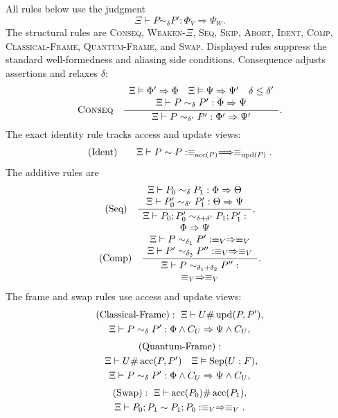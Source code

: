 \documentclass[conference,compsoc]{IEEEtran}
\newenvironment{tightdisplay}{%
  \begingroup
  \setlength{\arraycolsep}{2pt}%
  \[
}{%
  \]
  \endgroup
}
\begin{document}
All rules below use the judgment
\[
\Xi\vdash
P\sim_\delta P':\Phi_V\Longrightarrow\Psi_W .
\]
The structural rules are \textsc{Conseq}, \textsc{Weaken-\(\Xi\)},
\textsc{Seq}, \textsc{Skip}, \textsc{Abort}, \textsc{Ident}, \textsc{Comp},
\textsc{Classical-Frame}, \textsc{Quantum-Frame}, and \textsc{Swap}. Displayed
rules suppress the standard well-formedness and aliasing side conditions.
Consequence adjusts assertions and relaxes \(\delta\):
\begin{tightdisplay}
\textsc{Conseq}\quad
\frac{\begin{array}{c}
\Xi\vDash\Phi'\Rightarrow\Phi\quad
\Xi\vDash\Psi\Rightarrow\Psi'\quad
\delta\le\delta'\\
\Xi\vdash
P\sim_\delta P':\Phi\Rightarrow\Psi
\end{array}}
{\Xi\vdash
P\sim_{\delta'}P':\Phi'\Rightarrow\Psi'} .
\end{tightdisplay}
The exact identity rule tracks access and update views:
\[
\text{\rm (Ident)}\qquad
\Xi\vdash P\sim P:
\equiv_{\operatorname{acc}(P)}
\Longrightarrow
\equiv_{\operatorname{upd}(P)} .
\]
The additive rules are
\[
\begin{array}{c}
\text{\rm (Seq)}\quad
\dfrac{\begin{array}{c}
\Xi\vdash P_0\sim_{\delta}P_1:\Phi\Rightarrow\Theta\\
\Xi\vdash P'_0\sim_{\delta'}P'_1:\Theta\Rightarrow\Psi
\end{array}}
{\begin{array}{c}
\Xi\vdash
P_0;P'_0\sim_{\delta+\delta'}P_1;P'_1:\\
\Phi\Rightarrow\Psi
\end{array}},
\\[4mm]
\text{\rm (Comp)}\quad
\dfrac{\begin{array}{c}
\Xi\vdash P\sim_{\delta_1}P':\equiv_V\Rightarrow\equiv_V\\
\Xi\vdash P'\sim_{\delta_2}P'':\equiv_V\Rightarrow\equiv_V
\end{array}}
{\begin{array}{c}
\Xi\vdash
P\sim_{\delta_1+\delta_2}P'':\\
\equiv_V\Rightarrow\equiv_V
\end{array}}.
\end{array}
\]
The frame and swap rules use access and update views:
\[
\begin{gathered}
\text{\rm (Classical-Frame)}:\ 
\Xi\vdash U\#\operatorname{upd}(P,P'),\\
\Xi\vdash
P\sim_\delta P':\Phi\land C_U\Rightarrow\Psi\land C_U,\\[1mm]
\text{\rm (Quantum-Frame)}:\\\ 
\Xi\vdash U\#\operatorname{acc}(P,P')\quad
\Xi\vDash\operatorname{Sep}(U:F),\\
\Xi\vdash
P\sim_\delta P':\Phi\land C_U\Rightarrow\Psi\land C_U,\\[1mm]
\text{\rm (Swap)}:\ 
\Xi\vdash\operatorname{acc}(P_0)\#\operatorname{acc}(P_1),\\
\Xi\vdash
P_0;P_1\sim P_1;P_0:\equiv_V\Rightarrow\equiv_V .
\end{gathered}
\]
\end{document}
